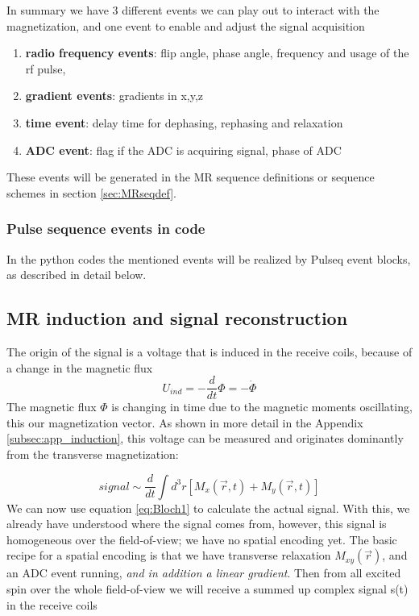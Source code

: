 \documentclass[a4paper,12pt]{extarticle}
\begin{document}
In summary we have 3 different events we can play out to interact with the magnetization, and one event to enable and adjust the signal acquisition
\begin{enumerate}
\itemsep-4pt 
\item \textbf{radio frequency events}: flip angle, phase angle, frequency and usage of the rf pulse, 
\item \textbf{gradient events}: gradients in x,y,z
\item \textbf{time event}: delay time for dephasing, rephasing and relaxation
\item \textbf{ADC event}: flag if the ADC is acquiring signal, phase of ADC
\end{enumerate}

These events will be generated in the MR sequence definitions or sequence schemes in section \ref{sec:MRseqdef}.

\subsubsection{Pulse sequence events in code}

In the python codes the mentioned events will be realized by Pulseq event blocks, as described in detail below.

 \subsection{MR induction and signal reconstruction}
 The origin of the signal is a voltage that is induced in the receive coils, because of a change in the magnetic flux
 \begin{equation}
 U_{ind}=-\frac{d}{dt}\Phi=-\dot\Phi
 \end{equation}
 The magnetic flux $\Phi$ is changing in time due to the magnetic moments oscillating, this our magnetization vector. As shown in more detail in the Appendix \ref{subsec:app_induction}, this voltage can be measured and originates dominantly from the transverse magnetization:
 
\begin{equation}
signal\sim\frac{d}{dt}\int d^{3}r[M_{x}(\vec{r},t)+M_{y}(\vec{r},t)]
\end{equation}
We can now use equation \eqref{eq:Bloch1} to calculate the actual signal. With this, we already have understood where the signal comes from, however, this signal is homogeneous over the field-of-view; we have no spatial encoding yet. 
 The basic recipe for a spatial encoding is that we have transverse relaxation $M_{xy}(\vec{r})$,  and an ADC event running, \emph{and in addition a linear gradient}. Then from all excited spin over the whole field-of-view we will receive a summed up complex signal s(t) in the receive coils  
 
\end{document}
